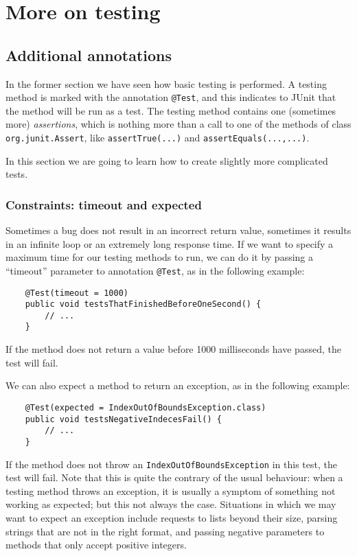 
\section{More on testing}
\label{sec:more-testing}

\subsection{Additional annotations}
\label{sec:addit-annot}

In the former section we have seen how basic testing is performed. A
testing method is marked with the annotation \verb+@Test+, and this
indicates to JUnit that the method will be run as a test. The testing
method contains one (sometimes more) \emph{assertions}, which is
nothing more than a call to one of the methods of class
\verb+org.junit.Assert+, like \verb+assertTrue(...)+ 
and \verb+assertEquals(...,...)+. 

In this section we are going to learn how to create slightly more
complicated tests. 

\subsubsection*{Constraints: timeout and expected}
\label{sec:timeout}

Sometimes a bug does not result in an incorrect return value,
sometimes it results in an infinite loop or an extremely long response
time. If we want to specify a maximum time for our testing methods to
run, we can do it by passing a ``timeout'' parameter to annotation
\verb+@Test+, as in the following example: 

\begin{verbatim}
    @Test(timeout = 1000)  
    public void testsThatFinishedBeforeOneSecond() {  
        // ...
    }  
\end{verbatim}

If the method does not return a value before 1000 milliseconds have
passed, the test will fail. 

We can also expect a method to return an exception, as in the
following example: 

\begin{verbatim}
    @Test(expected = IndexOutOfBoundsException.class)
    public void testsNegativeIndecesFail() {  
        // ...
    }  
\end{verbatim}

If the method does not throw an \verb+IndexOutOfBoundsException+ in
this test, the test will fail. Note that this is quite the contrary of
the usual behaviour: when a testing method throws an exception, it is
usually a symptom of something not working as expected; but this not
always the case. Situations in which we may want to expect an exception
include requests to lists beyond their size, parsing strings that
are not in the right format, and passing negative parameters to
methods that only accept positive integers. 

